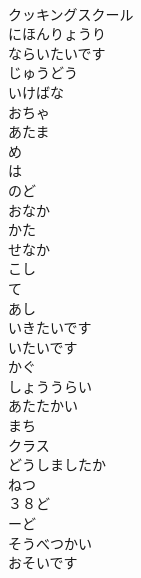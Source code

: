 \documentclass[8pt]{extreport}
\begin{document}
\begin{CJK}{UTF8}{min}
\\	クッキングスクール		
\\	にほんりょうり		
\\	ならいたいです		
\\	じゅうどう		
\\	いけばな		
\\	おちゃ		
\\	あたま		
\\	め		
\\	は		
\\	のど		
\\	おなか		
\\	かた		
\\	せなか		
\\	こし		
\\	て		
\\	あし		
\\	いきたいです		
\\	いたいです		
\\	かぐ		
\\	しょううらい		
\\	あたたかい		
\\	まち		
\\	クラス		
\\	どうしましたか		
\\	ねつ		
\\	３８ど		
\\	ーど		
\\	そうべつかい		
\\	おそいです		
\end{CJK}
\end{document}
